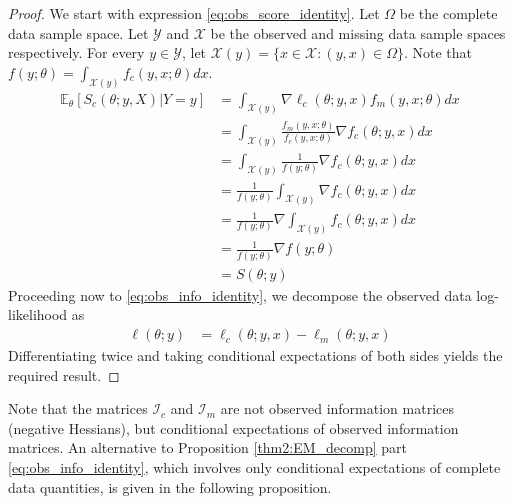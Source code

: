 \documentclass[ss]{imsart}
\theoremstyle{plain}
\theoremstyle{definition}
\theoremstyle{remark}
\newcommand{\bE}{\mathbb{E}}
\begin{document}
\begin{proof}
    We start with expression \ref{eq:obs_score_identity}. Let $\Omega$ be the complete data sample space. Let $\mathcal{Y}$ and $\mathcal{X}$ be the observed and missing data sample spaces respectively. For every $y \in \mathcal{Y}$, let $\mathcal{X}(y) = \{ x \in \mathcal{X}: (y,x) \in \Omega\}$. Note that $f(y; \theta) = \int_{\mathcal{X}(y)} f_c(y, x; \theta) dx$.
    \begin{align}
        \bE_\theta [S_c(\theta; y, X)|Y=y] &= \int_{\mathcal{X}(y)} \nabla \ell_c(\theta; y, x) f_m(y, x; \theta) dx \nonumber\\
        &= \int_{\mathcal{X}(y)} \frac{f_m(y, x; \theta)}{f_c(y, x; \theta)} \nabla f_c(\theta; y, x) dx \nonumber\\
        &= \int_{\mathcal{X}(y)} \frac{1}{f(y; \theta)} \nabla f_c(\theta; y, x) dx\nonumber\\
        &= \frac{1}{f(y; \theta)} \int_{\mathcal{X}(y)} \nabla f_c(\theta; y, x) dx\nonumber\\
        &= \frac{1}{f(y; \theta)} \nabla \int_{\mathcal{X}(y)} f_c(\theta; y, x) dx \nonumber\\
        &= \frac{1}{f(y; \theta)} \nabla f(y; \theta)\nonumber\\
        &= S(\theta; y) \nonumber
    \end{align}
    Proceeding now to \ref{eq:obs_info_identity}, we decompose the observed data log-likelihood as
    \begin{align*}
        \ell(\theta; y) &= \ell_c(\theta; y, x) - \ell_m(\theta; y, x)
    \end{align*}
    Differentiating twice and taking conditional expectations of both sides yields the required result.
\end{proof}

Note that the matrices $\mathcal{I}_c$ and $\mathcal{I}_m$ are not observed information matrices (negative Hessians), but conditional expectations of observed information matrices. 
An alternative to Proposition \ref{thm2:EM_decomp} part \ref{eq:obs_info_identity}, which involves only conditional expectations of complete data quantities, is given in the following proposition.
\end{document}
